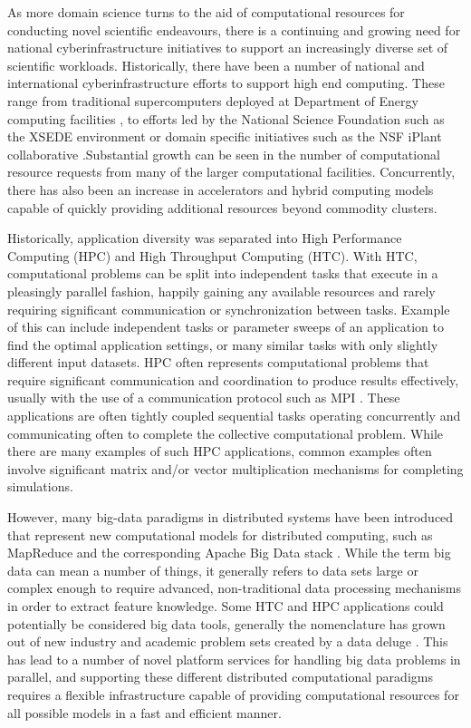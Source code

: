 As more domain science turns to the aid of computational resources for conducting novel scientific endeavours, there is a continuing and growing need for national cyberinfrastructure initiatives to support an increasingly diverse set of scientific workloads. Historically, there have been a number of national and international cyberinfrastructure efforts to support high end computing. These range from traditional supercomputers deployed at Department of Energy computing facilities \cite{bland2012titan}, to efforts led by the National Science Foundation such as the XSEDE environment \cite{towns2014xsede} or domain specific initiatives such as the NSF iPlant collaborative \cite{goff2011iplant}.Substantial growth can be seen in the number of computational resource requests \cite{towns2014xsede, antypas2008nersc} from many of the larger computational facilities.  Concurrently, there has also been an increase in accelerators and hybrid computing models capable of quickly providing additional resources \cite{vetter2011keeneland} beyond commodity clusters.
 
Historically, application diversity was separated into High Performance Computing (HPC) and High Throughput Computing (HTC).  With HTC, computational problems can be split into independent tasks that execute in a pleasingly parallel fashion, happily gaining any available resources and rarely requiring significant communication or synchronization between tasks.  Example of this can include independent tasks or parameter sweeps of an application to find the optimal application settings, or many similar tasks with only slightly different input datasets.  HPC often represents computational problems that require significant communication and coordination to produce results effectively, usually with the use of a communication protocol such as MPI \cite{mpi}. These applications are often tightly coupled sequential tasks operating concurrently and communicating often to complete the collective computational problem.  While there are many examples of such HPC applications, common examples often involve significant matrix and/or vector multiplication mechanisms \cite{fox1987matrix} for completing simulations. 

However, many big-data paradigms \cite{agrawal2011big} in distributed systems have been introduced that represent new computational models for distributed computing, such as MapReduce \cite{dean2008mapreduce} and the corresponding Apache Big Data stack \cite{kamburugamuve2013survey, chen2014big}.  While the term big data can mean a number of things, it generally refers to data sets large or complex enough to require advanced, non-traditional data processing mechanisms in order to extract feature knowledge. Some HTC and HPC applications could potentially be considered big data tools, generally the nomenclature has grown out of new industry and academic problem sets created by a data deluge \cite{bell2009deluge}.  This has lead to a number of novel platform services for handling big data problems in parallel, and supporting these different distributed computational paradigms requires a flexible infrastructure capable of providing computational resources for all possible models in a fast and efficient manner.  


